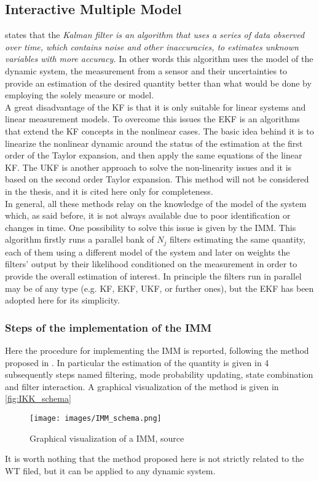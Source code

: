 \subsection{Interactive Multiple Model}\label{subsec:IMM}
\cite{Kalman_Filter_and_Its_Application} states that the \textit{Kalman filter is an algorithm that uses a series of data observed over time, which contains noise and other inaccuracies, to estimates unknown variables with more accuracy.} In other words this algorithm uses the model of the dynamic system, the measurement from a sensor and their uncertainties to provide an estimation of the desired quantity better than what would be done by employing the solely measure or model.\\
 A great disadvantage of the \acrfull{KF} is that it is only suitable for linear systems and linear measurement models. To overcome this issues the \acrfull{EKF} is an algorithms that extend the KF concepts in the nonlinear cases. The basic idea behind it is to linearize the nonlinear dynamic around the status of the estimation at the first order of the Taylor expansion, and then apply the same equations of the linear \acrshort{KF}. The \acrfull{UKF} is another approach to solve the non-linearity issues and it is based on the second order Taylor expansion. This method will not be considered in the thesis, and it is cited here only for completeness.\\
In general, all these methods relay on the knowledge of the model of the system which, as said before, it is not always available due to poor identification or changes in time. One possibility to solve this issue is given by the \acrshort{IMM}. This algorithm firstly runs a parallel bank of $N_j$ filters estimating the same quantity, each of them using a different model of the system and later on weights the filters' output by their likelihood conditioned on the measurement in order to provide the overall estimation of interest. In principle the filters run in parallel may be of any type (e.g. KF, EKF, UKF, or further ones), but the EKF has been adopted here for its simplicity. 

\subsubsection{Steps of the implementation of the IMM}
Here the procedure for implementing the IMM is reported, following the method proposed in \cite{kalman_based_IMM}. In particular the estimation of the quantity is given in 4 subsequently steps named filtering, mode probability updating, state combination and filter interaction. A graphical visualization of the method is given in \autoref{fig:IKK_schema}
\begin{figure}[H]
  \centering
  \texttt{[image: images/IMM\_schema.png]}
  \caption{Graphical visualization of a IMM, source \cite{kalman_based_IMM}}
  \label{fig:IKK_schema}
\end{figure}
It is worth nothing that the method proposed here is not strictly related to the WT filed, but it can be applied to any dynamic system.

